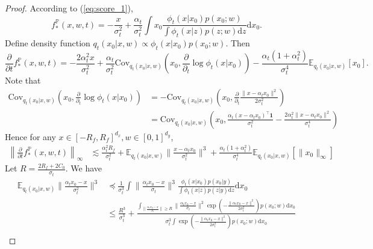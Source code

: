 \documentclass{article}
\numberwithin{equation}{section}
\def\eqref#1{equation~\ref{#1}}
\newcommand{\E}{\mathbb{E}}
\newcommand{\Cov}{\mathrm{Cov}}
\newcommand{\dif}{\mathrm{d}}
\theoremstyle{definition}
\renewcommand{\P}{\mathbb{P}}
\renewcommand{\eqref}[1]{(\ref{#1})}
\begin{document}
\begin{proof}
    According to \eqref{eq:score_1},
    \begin{equation}
        f_*^\P(x,w,t)=-\frac{x}{\sigma_t^2}+\frac{\alpha_t}{\sigma_t^2}\int x_0\frac{\phi_t(x|x_0)p(x_0;w)}{\int \phi_t(x|z)p(z;w)\dif z}\dif x_0.
    \end{equation}
    Define density function $q_t(x_0|x,w)\propto \phi_t(x|x_0)p(x_0;w)$. Then
    \begin{equation}
        \frac{\partial}{\partial t}f_*^\P(x,w,t)
        = -\frac{2\alpha_t^2x}{\sigma_t^2}+\frac{\alpha_t}{\sigma_t^2}\Cov_{q_t(x_0|x,w)}\left(x_0,\frac{\partial}{\partial_t}\log\phi_t(x|x_0)\right) - \frac{\alpha_t(1+\alpha_t^2)}{\sigma_t^4}\E_{q_t(x_0|x,w)}[x_0].
    \end{equation}
    Note that 
    \begin{equation}
        \begin{aligned}
            \Cov_{q_t(x_0|x,w)}\left(x_0,\frac{\partial}{\partial_t}\log\phi_t(x|x_0)\right)
            &= -\Cov_{q_t(x_0|x,w)}\left(x_0,\frac{\partial}{\partial_t}\frac{\|x-\alpha_tx_0\|^2}{2\sigma_t^2}\right) \\
            &= \Cov_{q_t(x_0|x,w)}\left(x_0,\frac{\alpha_t(x-\alpha_tx_0)^\top\bm{1}}{\sigma_t^2}-\frac{2\alpha_t^2\|x-\alpha_tx_0\|^2}{\sigma_t^4}\right)
        \end{aligned}
    \end{equation}
    Hence for any $x\in[-R_f,R_f]^{d_x},w\in[0,1]^{d_y}$, 
    \begin{equation}
        \begin{aligned}
            \left\|\frac{\partial}{\partial t}f_*^\P(x,w,t)\right\|_\infty
            &\lesssim \frac{\alpha_t^2R_f}{\sigma_t^2}+\E_{q_t(x_0|x,w)}\Big\|\frac{x-\alpha_tx_0}{\sigma_t^2}\Big\|^3 + \frac{\alpha_t(1+\alpha_t^2)}{\sigma_t^4}\E_{q_t(x_0|x,w)}[\|x_0\|_\infty]
        \end{aligned}
    \end{equation}
    Let $R=\frac{2R_f+2C_0}{\sigma_t}$. We have
    \begin{equation}
        \begin{aligned}
            \E_{q_t(x_0|x,w)}\Big\|\frac{\alpha_tx_0-x}{\sigma_t^2}\Big\|^3
            &\preceq \frac{1}{\sigma_t^3}\int \big\|\frac{\alpha_tx_0-x}{\sigma_t}\big\|^3\frac{\phi_t(x|x_0)p(x_0|y)}{\int \phi_t(x|z)p(z|y)\dif z}\dif x_0 \\
            &\leq \frac{R^3}{\sigma_t^3} + \frac{\int_{\|\frac{\alpha_tx_0-x}{\sigma_t}\|\geq R} \|\frac{\alpha_tx_0-x}{\sigma_t}\|^2\exp\left(-\frac{\|\alpha_tx_0-x\|^2}{2\sigma_t^2}\right)p(x_0;w)\dif x_0}{\sigma_t^3\int \exp\left(-\frac{\|\alpha_tx_0-x\|^2}{2\sigma_t^2}\right)p(x_0;w)\dif x_0} \\

\end{aligned}
\end{equation}
\end{proof}
\end{document}

